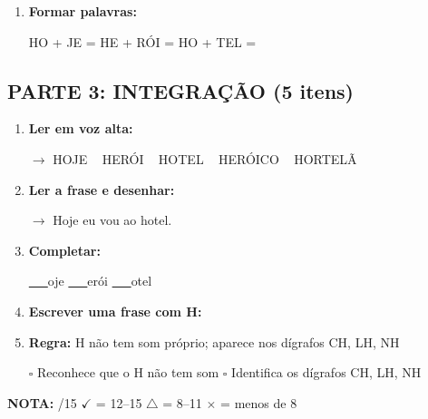 \begin{exercicio}
\begin{enumerate}[resume]
  \item \textbf{Formar palavras:}
  \begin{center}
  HO + JE = \underline{\hspace{2cm}} \quad HE + RÓI = \underline{\hspace{2cm}} \quad HO + TEL = \underline{\hspace{2cm}}
  \end{center}
\end{enumerate}

\subsection*{PARTE 3: INTEGRAÇÃO (5 itens)}

\begin{enumerate}[resume]
  \item \textbf{Ler em voz alta:}
  \begin{center}
  $\rightarrow$ HOJE  ~  HERÓI  ~  HOTEL  ~  HERÓICO  ~  HORTELÃ
  \end{center}

  \item \textbf{Ler a frase e desenhar:}
  \begin{center}
  $\rightarrow$ Hoje eu vou ao hotel.
  \end{center}
  \begin{center}
  \end{center}

  \item \textbf{Completar:}
  \begin{center}
  \underline{~~~}oje \quad \underline{~~~}erói \quad \underline{~~~}otel
  \end{center}

  \item \textbf{Escrever uma frase com H:}
  \begin{center}
  \underline{\hspace{12cm}}
  \end{center}

  \item \textbf{Regra:} H não tem som próprio; aparece nos dígrafos CH, LH, NH
  \begin{center}
  $\square$ Reconhece que o H não tem som \quad $\square$ Identifica os dígrafos CH, LH, NH
  \end{center}
\end{enumerate}

\noindent\textbf{NOTA:} \underline{\hspace{1cm}}/15 \quad $\checkmark$ = 12--15 \quad $\triangle$ = 8--11 \quad $\times$ = menos de 8
\end{exercicio}

